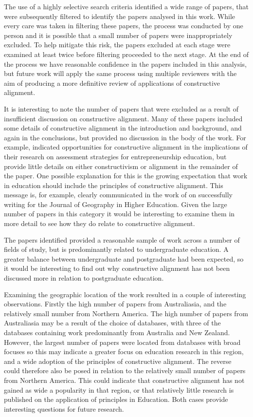 The use of a highly selective search criteria identified a wide range of papers, that were subsequently filtered to identify the papers analysed in this work. While every care was taken in filtering these papers, the process was conducted by one person and it is possible that a small number of papers were inappropriately excluded. To help mitigate this risk, the papers excluded at each stage were examined at least twice before filtering proceeded to the next stage. At the end of the process we have reasonable confidence in the papers included in this analysis, but future work will apply the same process using multiple reviewers with the aim of producing a more definitive review of applications of constructive alignment. 

It is interesting to note the number of papers that were excluded as a result of insufficient discussion on constructive alignment. Many of these papers included some details of constructive alignment in the introduction and background, and again in the conclusions, but provided no discussion in the body of the work. For example, \citet{Penaluna:EducationTraining:2009} indicated opportunities for constructive alignment in the implications of their research on assessment strategies for entrepreneurship education, but provide little details on either constructivism or alignment in the remainder of the paper. One possible explanation for this is the growing expectation that work in education should include the principles of constructive alignment. This message is, for example, clearly communicated in the work of \citet{Haigh:2012} on successfully writing for the Journal of Geography in Higher Education. Given the large number of papers in this category it would be interesting to examine them in more detail to see how they do relate to constructive alignment. 

The papers identified provided a reasonable sample of work across a number of fields of study, but is predominantly related to undergraduate education. A greater balance between undergraduate and postgraduate had been expected, so it would be interesting to find out why constructive alignment has not been discussed more in relation to postgraduate education.

Examining the geographic location of the work resulted in a couple of interesting observations. Firstly the high number of papers from Australiasia, and the relatively small number from Northern America. The high number of papers from Australiasia may be a result of the choice of databases, with three of the databases containing work predominantly from Australia and New Zealand. However, the largest number of papers were located from databases with broad focuses so this may indicate a greater focus on education research in this region, and a wide adoption of the principles of constructive alignment. The reverse could therefore also be posed in relation to the relatively small number of papers from Northern America. This could indicate that constructive alignment has not gained as wide a popularity in that region, or that relatively little research is published on the application of principles in Education. Both cases provide interesting questions for future research.

